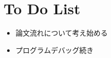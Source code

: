\documentclass[11pt]{jsarticle}
\begin{document}
	\section{To Do List}
		\begin{itemize}
			\item 論文流れについて考え始める
			\item プログラムデバッグ続き
		\end{itemize}
				
	\newpage
\vspace{10cm}
	

\vspace{14cm}
	\articleSPRfour
	\articleSPRfive
\end{document}
